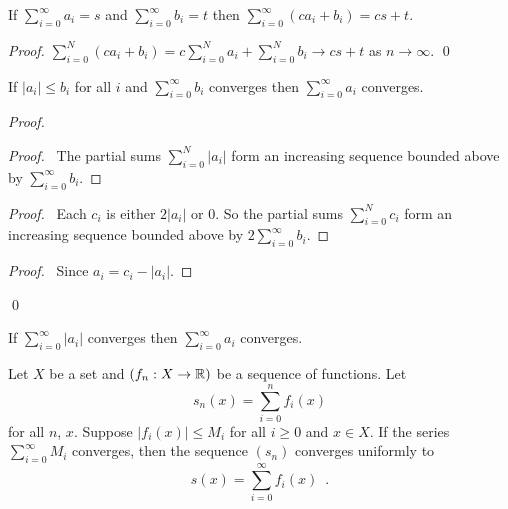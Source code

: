 \begin{theorem}
    If $\sum_{i=0}^\infty a_i = s$ and $\sum_{i=0}^\infty b_i = t$ then $\sum_{i=0}^\infty (ca_i + b_i) = cs+t$.
\end{theorem}

\begin{proof}
    \pf $\sum_{i=0}^N (ca_i + b_i) = c \sum_{i=0}^N a_i + \sum_{i=0}^N b_i \rightarrow cs+t$ as $n \rightarrow \infty$. \qed
\end{proof}

\begin{theorem}
    If $|a_i| \leq b_i$ for all $i$ and $\sum_{i=0}^\infty b_i$ converges then $\sum_{i=0}^\infty a_i$ converges.
\end{theorem}

\begin{proof}
    \pf
    \begin{proof}
        \pf\ The partial sums $\sum_{i=0}^N |a_i|$ form an increasing sequence bounded above by $\sum_{i=0}^\infty b_i$.
    \end{proof}
    \begin{proof}
        \pf\ Each $c_i$ is either $2|a_i|$ or 0. So the partial sums $\sum_{i=0}^N c_i$ form an increasing sequence bounded above by $2 \sum_{i=0}^\infty b_i$.
    \end{proof}
    \qedstep
    \begin{proof}
        \pf\ Since $a_i = c_i - |a_i|$.
    \end{proof}
    \qed
\end{proof}

\begin{corollary}
    If $\sum_{i=0}^\infty |a_i|$ converges then $\sum_{i=0}^\infty a_i$ converges.
\end{corollary}

\begin{theorem}
    Let $X$ be a set and $(f_n : X \rightarrow \mathbb{R})$ be a sequence of functions. Let
    \[ s_n(x) = \sum_{i=0}^n f_i(x) \]
    for all $n$, $x$. Suppose $|f_i(x)| \leq M_i$ for all $i \geq 0$ and $x \in X$.
    If the series $\sum_{i=0}^\infty M_i$ converges, then the sequence $(s_n)$ converges uniformly to
    \[ s(x) = \sum_{i=0}^\infty f_i(x) \enspace . \]
\end{theorem}

